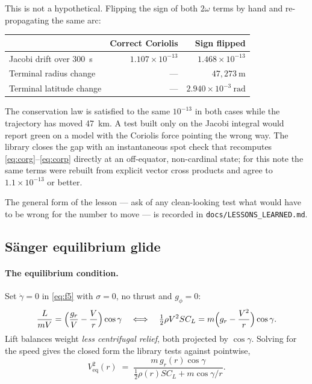 \documentclass[11pt]{article}
\newcommand{\code}[1]{\texttt{#1}}
\begin{document}
This is not a hypothetical. Flipping the sign of both $2\omega$ terms by hand
and re-propagating the same arc:

\begin{center}
\begin{tabular}{lrr}
\toprule
& Correct Coriolis & Sign flipped \\
\midrule
Jacobi drift over 300~s   & $1.107\times10^{-13}$ & $1.468\times10^{-13}$ \\
Terminal radius change    & --- & $47{,}273~\mathrm{m}$ \\
Terminal latitude change  & --- & $2.940\times10^{-3}~\mathrm{rad}$ \\
\bottomrule
\end{tabular}
\end{center}

The conservation law is satisfied to the same $10^{-13}$ in both cases while
the trajectory has moved 47~km. A test built only on the Jacobi integral would
report green on a model with the Coriolis force pointing the wrong way. The
library closes the gap with an instantaneous spot check that recomputes
\eqref{eq:corg}--\eqref{eq:corp} directly at an off-equator, non-cardinal
state; for this note the same terms were rebuilt from explicit vector cross
products and agree to $1.1\times10^{-13}$ or better.

The general form of the lesson --- ask of any clean-looking test what would
have to be wrong for the number to move --- is recorded in
\code{docs/LESSONS\_LEARNED.md}.

\subsection{S\"anger equilibrium glide}
\label{sec:saenger}

\paragraph{The equilibrium condition.}
Set $\dot\gamma = 0$ in \eqref{eq:f5} with $\sigma=0$, no thrust and
$g_\phi=0$:
\begin{equation}
  \frac{L}{mV} = \Bigl(\frac{g_r}{V} - \frac{V}{r}\Bigr)\cos\gamma
  \quad\Longleftrightarrow\quad
  \tfrac12\rho V^2 S C_L = m\Bigl(g_r - \frac{V^2}{r}\Bigr)\cos\gamma .
  \label{eq:eqglide}
\end{equation}
Lift balances weight \emph{less centrifugal relief}, both projected by
$\cos\gamma$. Solving for the speed gives the closed form the library tests
against pointwise,
\begin{equation}
  V_{\text{eq}}^2(r) \;=\;
  \frac{m\,g_r(r)\cos\gamma}
       {\tfrac12\rho(r) S C_L + m\cos\gamma/r} .
  \label{eq:veq}
\end{equation}
\end{document}
